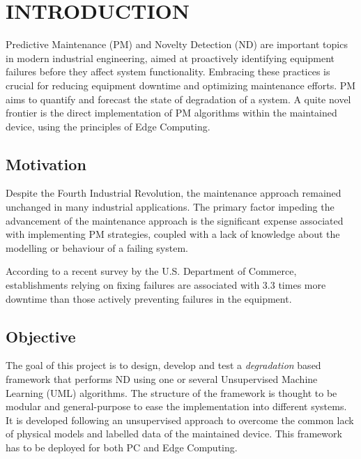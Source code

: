 \section{INTRODUCTION}
\label{sec:introduction}

Predictive Maintenance (PM) and Novelty Detection (ND) are important topics in modern industrial engineering, aimed at proactively identifying equipment failures before they affect system functionality. Embracing these practices is crucial for reducing equipment downtime and optimizing maintenance efforts. PM aims to quantify and forecast the state of degradation of a system. A quite novel frontier is the direct implementation of PM algorithms within the maintained device, using the principles of Edge Computing.

\subsection{Motivation}
Despite the Fourth Industrial Revolution, the maintenance approach remained unchanged in many industrial applications. The primary factor impeding the advancement of the maintenance approach is the significant expense associated with implementing PM strategies, coupled with a lack of knowledge about the modelling or behaviour of a failing system.

According to a recent survey by the U.S. Department of Commerce, establishments relying on fixing failures are associated with 3.3 times more downtime than those actively preventing failures in the equipment. 

\subsection{Objective}
The goal of this project is to design, develop and test a \emph{degradation} based framework
that performs ND using one or several Unsupervised Machine Learning (UML) algorithms. 
The structure of the framework is thought to be modular and general-purpose to ease the implementation into different systems. It is developed following an unsupervised approach to overcome the common lack of physical models and labelled data of the maintained device. This framework has to be deployed for both PC and Edge Computing.